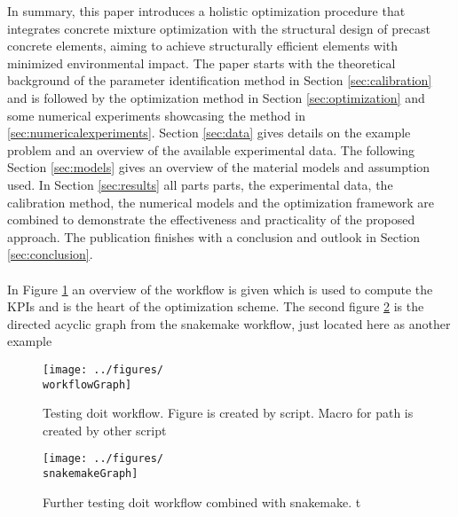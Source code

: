 In summary, this paper introduces a holistic optimization procedure that integrates concrete mixture optimization with the structural design of precast concrete elements, aiming to achieve structurally efficient elements with minimized environmental impact. 
The paper starts  with the theoretical background of the parameter identification method in Section \ref{sec:calibration} and is followed by the optimization method in Section \ref{sec:optimization} and some numerical experiments showcasing the method in \ref{sec:numericalexperiments}.
Section \ref{sec:data} gives details on the example problem and an overview of the available experimental data.
The following Section \ref{sec:models} gives an overview of the material models and assumption used. 
In Section \ref{sec:results} all parts parts, the experimental data, the calibration method, the numerical models and the optimization framework are combined to demonstrate the effectiveness and practicality of the proposed approach.
The publication finishes with a conclusion and outlook in Section \ref{sec:conclusion}.
\\\\
In Figure \ref{fig:workflow} an overview of the workflow is given which is used to compute the KPIs and is the heart of the optimization scheme.
The second figure \ref{fig:snakemake_workflow} is the directed acyclic graph from the snakemake workflow, just located here as another example
\begin{figure}[ht]%
	\centering
	\texttt{[image: ../figures/\\workflowGraph]}
	\caption{Testing doit workflow. Figure is created by script. Macro for path is created by other script}\label{fig:workflow}
\end{figure}
\begin{figure}[ht]%
\centering
\texttt{[image: ../figures/\\snakemakeGraph]}
\caption{Further testing doit workflow combined with snakemake. t}\label{fig:snakemake_workflow}
\end{figure}


